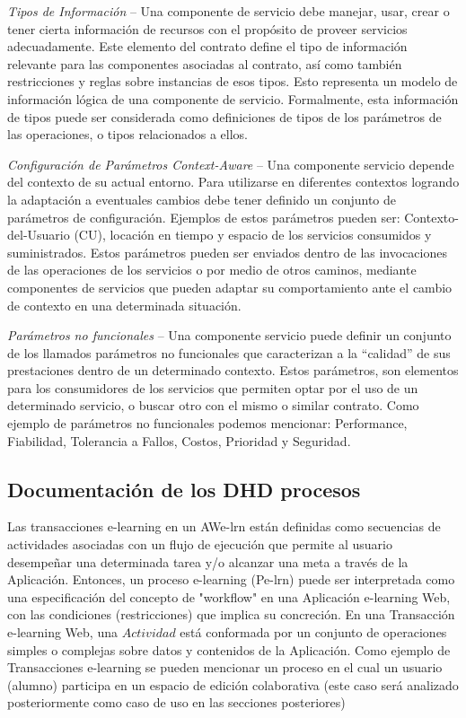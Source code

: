 \textit{Tipos de Información} –  Una componente de servicio debe  manejar, usar,
 crear o tener cierta información de recursos con el propósito de proveer
servicios adecuadamente.  Este elemento del contrato define el tipo de
información relevante para las componentes  asociadas al contrato, así como
también restricciones y reglas sobre instancias de esos tipos. Esto representa
un modelo de información lógica de una componente de servicio. Formalmente, esta
información de tipos puede ser considerada como definiciones de tipos de  los
parámetros de las operaciones, o tipos relacionados a ellos.

\textit{Configuración de Parámetros Context-Aware} – Una componente servicio
depende del contexto de su actual entorno. Para utilizarse en diferentes
contextos logrando la adaptación a eventuales cambios debe tener definido un
conjunto de parámetros de configuración.  Ejemplos de estos parámetros pueden
ser: Contexto-del-Usuario (CU), locación en tiempo y espacio de los servicios
consumidos y suministrados. Estos parámetros pueden ser enviados dentro de las
invocaciones de las operaciones de los servicios o por medio de otros caminos,
mediante componentes de servicios que pueden adaptar su comportamiento ante el
cambio de contexto en una determinada situación.  

\textit{Parámetros no funcionales} – Una componente servicio puede definir un
conjunto de los llamados parámetros no funcionales que caracterizan a la
“calidad” de sus prestaciones dentro de un determinado contexto. Estos
parámetros, son elementos para los consumidores de los servicios que permiten
optar por el uso de un determinado  servicio, o buscar otro con el mismo o
similar contrato. Como ejemplo de parámetros no funcionales podemos mencionar:
Performance, Fiabilidad, Tolerancia a Fallos, Costos, Prioridad y Seguridad.


\subsection{Documentación de los DHD procesos} \label{documentacion7}

Las transacciones e-learning en un AWe-lrn están definidas como secuencias de
actividades asociadas con un flujo de ejecución que permite al usuario
desempeñar una determinada tarea  y/o alcanzar una meta a través de la
Aplicación. Entonces, un proceso e-learning (Pe-lrn) puede ser interpretada como
una especificación del concepto de "workflow" en una Aplicación e-learning Web,
con las condiciones (restricciones) que implica su concreción. En una
Transacción e-learning Web, una  $Actividad$ está  conformada por un conjunto de
operaciones simples o complejas sobre datos y contenidos de la Aplicación. Como
ejemplo de Transacciones e-learning se pueden mencionar un proceso en el cual un
usuario (alumno) participa en un espacio de edición colaborativa (este caso será
analizado posteriormente como caso de uso en las secciones posteriores) 


